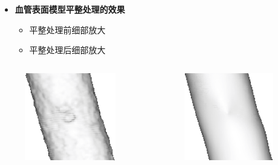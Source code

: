 \begin{frame}
\begin{itemize}
\item \textbf{血管表面模型平整处理的效果}
\begin{itemize}
 \item 平整处理前细部放大
 \item 平整处理后细部放大
\end{itemize}
\end{itemize}
\begin{columns}[b,onlytextwidth]
\begin{column}{.5\textwidth}
 \begin{figure}[t]
\centering
\includegraphics[height=1.5in]{../../Figures/methodologies/artifact.eps}
\end{figure}
\end{column}
\begin{column}{.5\textwidth}
 \begin{figure}[t]
\centering
\includegraphics[height=1.5in]{../../Figures/methodologies/artifact_removed.eps}
\end{figure}
\end{column}
\end{columns}
\end{frame}

